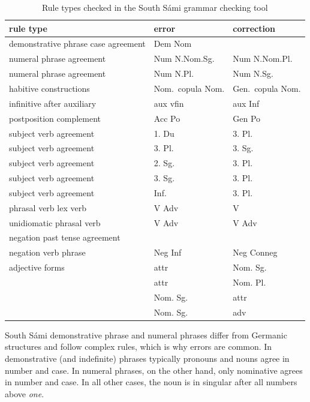 \documentclass[free]{flammie}
\begin{document}
\begin{table}[]
    \centering
    \begin{tabular}{lll}
    \bf rule type & \bf error & \bf correction \\
    \toprule
        demonstrative phrase case agreement & Dem Nom  &    \\
        \midrule
         numeral phrase agreement & Num N.Nom.Sg. & Num N.Nom.Pl. \\
         numeral phrase agreement & Num N.Pl. & Num N.Sg. \\
            \midrule
         habitive constructions  & Nom.\ copula Nom. & Gen.\ copula Nom. \\
        infinitive after auxiliary & aux vfin & aux Inf \\
        postposition complement & Acc Po & Gen Po \\
        \midrule
        subject verb agreement & 1. Du & 3. Pl. \\
       subject verb agreement & 3. Pl. & 3. Sg. \\
        subject verb agreement & 2. Sg. & 3. Pl. \\
       subject verb agreement & 3. Sg. & 3. Pl. \\
        subject verb agreement & Inf. & 3. Pl. \\
              \midrule

        phrasal verb lex verb & V Adv & V \\
        unidiomatic phrasal verb & V Adv & V Adv \\
        \midrule
        negation past tense agreement & & \\
        negation verb phrase & Neg Inf & Neg Conneg \\
        \midrule
        adjective forms & attr & Nom. Sg. \\
                        & attr & Nom. Pl. \\
                        & Nom. Sg. & attr \\
                        & Nom. Sg. & adv \\
        \bottomrule
    \end{tabular}
    \caption{Rule types checked in the South Sámi grammar checking
    tool\label{errorrules}}
\end{table}




South Sámi demonstrative phrase and numeral phrases differ from Germanic
structures and follow complex rules, which is why errors are common. In
demonstrative (and indefinite) phrases typically pronouns and nouns agree in
number and case. In numeral phrases, on the other hand, only nominative agrees
in number and case. In all other cases, the noun is in singular after all
numbers above \textit{one}.
\end{document}
